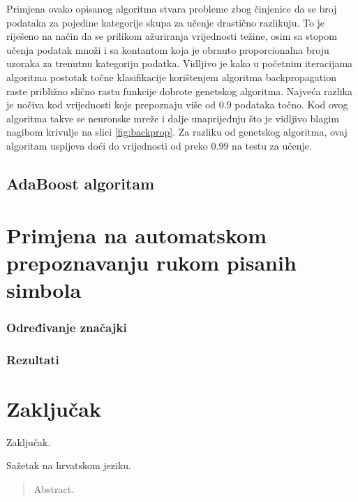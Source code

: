 \documentclass[times, utf8, zavrsni, numeric]{fer}
\begin{document}
Primjena ovako opisanog algoritma stvara probleme zbog činjenice da se broj podataka za pojedine kategorije skupa za učenje drastično razlikuju.
To je riješeno na način da se prilikom ažuriranja vrijednosti težine, osim sa stopom učenja podatak množi i sa kontantom koja je obrnuto proporcionalna broju uzoraka za trenutnu kategoriju podatka.
Vidljivo je kako u početnim iteracijama algoritma postotak točne klasifikacije korištenjem algoritma backpropagation raste približno slično rastu funkcije dobrote genetskog algoritma.
Najveća razlika je uočiva kod vrijednosti koje prepoznaju više od $0.9$ podataka točno.
Kod ovog algoritma takve se neuronske mreže i dalje unaprijeđuju što je vidljivo blagim nagibom krivulje na slici \ref{fig:backprop}.
Za razliku od genetskog algoritma, ovaj algoritam uspijeva doći do vrijednosti od preko $0.99$ na testu za učenje.

\section{AdaBoost algoritam}


\chapter{Primjena na automatskom prepoznavanju rukom pisanih simbola}
\subsection{Određivanje značajki}
\subsection{Rezultati}

\chapter{Zaključak}
Zaključak.





\begin{sazetak}
Sažetak na hrvatskom jeziku.

\end{sazetak}

\begin{abstract}
Abstract.

\end{abstract}
\end{document}
